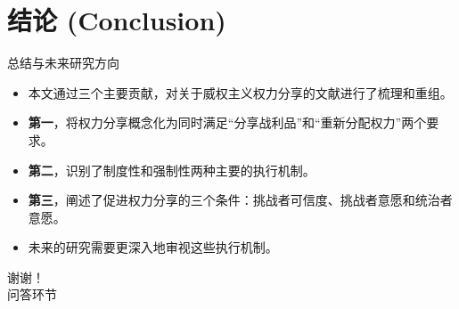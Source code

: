 \documentclass[aspectratio=169]{ctexbeamer}
\begin{document}
\section{结论 (Conclusion)}
\begin{frame}{总结与未来研究方向}
  \begin{itemize}
    \item 本文通过三个主要贡献，对关于威权主义权力分享的文献进行了梳理和重组。
    \item \textbf{第一}，将权力分享概念化为同时满足“分享战利品”和“重新分配权力”两个要求。
    \item \textbf{第二}，识别了制度性和强制性两种主要的执行机制。
    \item \textbf{第三}，阐述了促进权力分享的三个条件：挑战者可信度、挑战者意愿和统治者意愿。
    \item 未来的研究需要更深入地审视这些执行机制。
  \end{itemize}
\end{frame}

\begin{frame}
  \begin{center}
    \Huge 谢谢！\\
    \vspace{1cm}
    \Large 问答环节
  \end{center}
\end{frame}
\end{document}
